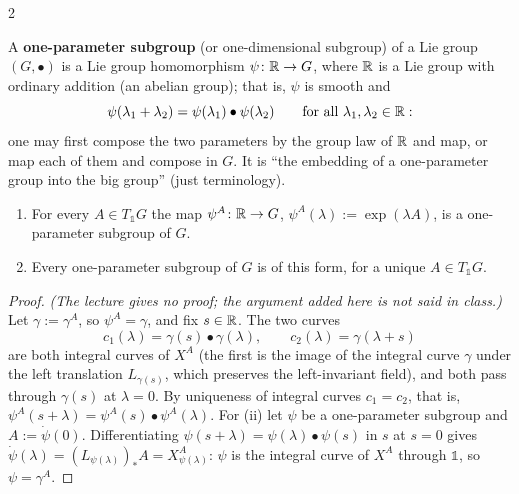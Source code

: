 \begin{paracol}{2}
\begin{definition}\label{def:rc-1ps}
A \textbf{one-parameter subgroup} (or one-dimensional subgroup) of a Lie group $(G,\bullet)$ is a Lie group homomorphism $\psi\colon\mathbb{R}\to G$, where $\mathbb{R}$ is a Lie group with ordinary addition (an abelian group); that is, $\psi$ is smooth and
\[
  \psi(\lambda_1+\lambda_2)=\psi(\lambda_1)\bullet\psi(\lambda_2)\qquad\text{for all }\lambda_1,\lambda_2\in\mathbb{R} :
\]
one may first compose the two parameters by the group law of $\mathbb{R}$ and map, or map each of them and compose in $G$. It is ``the embedding of a one-parameter group into the big group'' (just terminology).       
\end{definition}
\begin{theorem}\label{thm:rc-1ps}
\begin{enumerate}
  \item[(i)] For every $A\in T_{\mathbb 1}G$ the map $\psi^A\colon\mathbb{R}\to G$, $\psi^A(\lambda):=\exp(\lambda A)$, is a one-parameter subgroup of $G$.
  \item[(ii)] Every one-parameter subgroup of $G$ is of this form, for a unique $A\in T_{\mathbb 1}G$.
\end{enumerate}
\end{theorem}
\begin{proof}
\emph{(The lecture gives no proof; the argument added here is not said in class.)} Let $\gamma:=\gamma^A$, so $\psi^A=\gamma$, and fix $s\in\mathbb{R}$. The two curves
\[
  c_1(\lambda)=\gamma(s)\bullet\gamma(\lambda),\qquad c_2(\lambda)=\gamma(\lambda+s)
\]
are both integral curves of $X^A$ (the first is the image of the integral curve $\gamma$ under the left translation $L_{\gamma(s)}$, which preserves the left-invariant field), and both pass through $\gamma(s)$ at $\lambda=0$. By uniqueness of integral curves $c_1=c_2$, that is, $\psi^A(s+\lambda)=\psi^A(s)\bullet\psi^A(\lambda)$. For (ii) let $\psi$ be a one-parameter subgroup and $A:=\dot\psi(0)$. Differentiating $\psi(s+\lambda)=\psi(\lambda)\bullet\psi(s)$ in $s$ at $s=0$ gives $\dot\psi(\lambda)=(L_{\psi(\lambda)})_*A=X^A_{\psi(\lambda)}$: $\psi$ is the integral curve of $X^A$ through $\mathbb 1$, so $\psi=\gamma^A$.
  
\end{proof}

\end{paracol}

